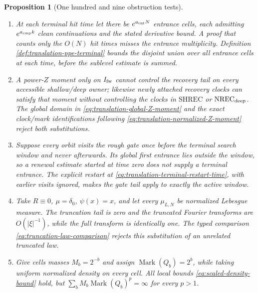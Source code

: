 \documentclass[11pt]{article}
\newtheorem{proposition}[theorem]{Proposition}
\begin{document}
\begin{proposition}[One hundred and nine obstruction tests]
\begin{enumerate}[label=\textup{(T\arabic*)}]
      frequency while restriction to successive misses concentrates on
      shorter and shorter curves and leaves the regular cone.  Ordinary
      mixing then does not justify multiplying the same block hazard.  The
      miss-conditioned stability in \textup{(G1)}, or the stopped renewal
      tail in \textup{(G2)}, of $\mathrm{TR\_PPE}_{\rm TERM}$ rejects this
      survivor-selection model.
\item At each terminal hit time let there be $e^{a_{\rm ent}N}$ entrance
      cells, each admitting $e^{a_{\rm cmp}k}$ clean continuations and the
      stated derivative bound.  A proof that counts only the $O(N)$ hit
      times misses the entrance multiplicity.  Definition
      \ref{def:translation-ppe-terminal} bounds the disjoint union over all
      entrance cells at each time, before the sublevel estimate is summed.
\item A power-$Z$ moment only on $I_{\rm fw}$ cannot control the recovery
      tail on every accessible shallow/deep owner; likewise newly attached
      recovery clocks can satisfy that moment without controlling the clocks
      in $\mathrm{SHREC}$ or $\mathrm{NREC}_{\rm deep}$.  The global domain
      in \eqref{eq:translation-global-Z-moment} and the exact clock/mark
      identifications following
      \eqref{eq:translation-normalized-Z-moment} reject both substitutions.
\item Suppose every orbit visits the rough gate once before the terminal
      search window and never afterwards.  Its global first entrance lies
      outside the window, so a renewal estimate started at time zero does not
      supply a terminal entrance.  The explicit restart at
      \eqref{eq:translation-terminal-restart-time}, with earlier visits
      ignored, makes the gate tail apply to exactly the active window.
\item Take $R\equiv0$, $\mu=\delta_0$, $\psi(x)=x$, and let every
      $\mu_{L,N}$ be normalized Lebesgue measure.  The truncation tail is zero
      and the truncated Fourier transforms are $O(|\xi|^{-1})$, while the full
      transform is identically one.  The typed comparison
      \eqref{eq:truncation-law-comparison} rejects this substitution of an
      unrelated truncated law.
\item Give cells masses $M_b=2^{-b}$ and assign
      $\operatorname{Mark}(Q_b)=2^b$, while taking uniform normalized density
      on every cell.  All local bounds \eqref{eq:scaled-density-bound} hold,
      but $\sum_bM_b\operatorname{Mark}(Q_b)^p=\infty$ for every $p>1$.

\end{enumerate}
\end{proposition}
\end{document}
